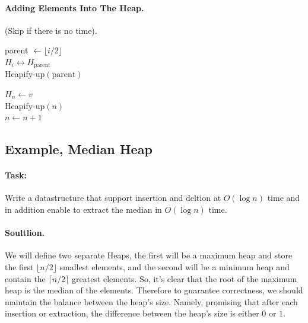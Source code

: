 \paragraph{Adding Elements Into The Heap.} (Skip if there is no time).


\begin{algorithm}[H]
parent $\leftarrow \lfloor i/2 \rfloor $ \\
 { 
  $ H_{i} \leftrightarrow H_{\text{parent}} $ \\ 
  Heapify-up$\left( \text{parent}  \right)$
}
\end{algorithm}





\begin{algorithm}[H]
$ H_{n} \leftarrow v $ \\ 
Heapify-up$\left( n \right)$\\
$ n \leftarrow n + 1 $ 
\end{algorithm}




\newpage 
\subsection*{Example, Median Heap}

\paragraph{Task:}Write a datastructure that support insertion and deltion at $O\left( \log n \right) $ time and in addition enable to extract the median in $O\left( \log n  \right)$ time. 

\paragraph{Soultlion.} We will define two separate Heaps, the first will be a maximum heap and store the first $ \lfloor n/2 \rfloor $ smallest elements, and the second will be a minimum heap and contain the $ \lceil n/2 \rceil$ greatest elements. So, it's clear that the root of the maximum heap is the median of the elements. Therefore to guarantee correctness, we should maintain the balance between the heap's size. Namely, promising that after each insertion or extraction, the difference between the heap's size is either $0$ or $1$.


